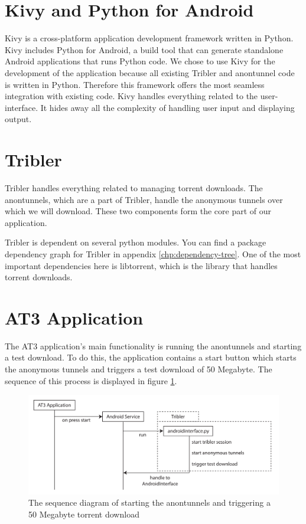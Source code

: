\section{Kivy and Python for Android}
Kivy is a cross-platform application development framework written in Python. Kivy includes Python for Android, a build tool that can generate standalone Android applications that runs Python code. We chose to use Kivy for the development of the application because all existing Tribler and anontunnel code is written in Python. Therefore this framework offers the most seamless integration with existing code. Kivy handles everything related to the user-interface. It hides away all the complexity of handling user input and displaying output.

\section{Tribler}
Tribler handles everything related to managing torrent downloads. The anontunnels, which are a part of Tribler, handle the anonymous tunnels over which we will download. These two components form the core part of our application.

Tribler is dependent on several python modules. You can find a package dependency graph for Tribler in appendix \ref{chp:dependency-tree}. One of the most important dependencies here is libtorrent, which is the library that handles torrent downloads.

\section{AT3 Application}
The AT3 application's main functionality is running the anontunnels and starting a test download. To do this, the application contains a start button which starts the anonymous tunnels and triggers a test download of 50 Megabyte. The sequence of this process is displayed in figure \ref{fig:sequencestart}.

\begin{figure}[h]
	\centering
	\includegraphics[width=\textwidth]{graphics/sequence-start.pdf}
	\caption{The sequence diagram of starting the anontunnels and triggering a 50 Megabyte torrent download}
	\label{fig:sequencestart}
\end{figure}


